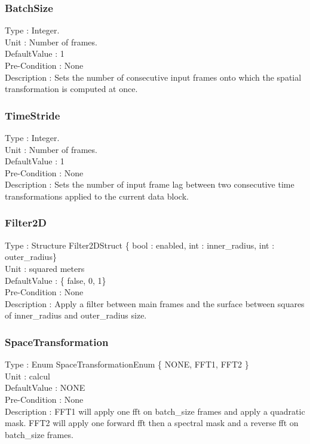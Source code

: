 \subsubsection{BatchSize}
\noindent
Type : Integer.\\
Unit : Number of frames.\\
DefaultValue : 1\\
Pre-Condition : None\\
Description : Sets the number of consecutive input frames onto which the spatial transformation is computed at once.\\

\subsubsection{TimeStride}
\noindent
Type : Integer.\\
Unit : Number of frames.\\
DefaultValue : 1\\
Pre-Condition : None\\
Description : Sets the number of input frame lag between two consecutive time transformations applied to the current data block.\\

\subsubsection{Filter2D}
\noindent
Type : Structure Filter2DStruct \{ bool : enabled, int : inner\_radius, int : outer\_radius\}\\
Unit : squared meters\\
DefaultValue : \{ false, 0, 1\}\\
Pre-Condition : None\\
Description : Apply a filter between main frames and the surface between squares of inner\_radius and outer\_radius size.\\

\subsubsection{SpaceTransformation}
\noindent
Type : Enum SpaceTransformationEnum \{ NONE, FFT1, FFT2 \}\\
Unit : calcul\\
DefaultValue : NONE\\
Pre-Condition : None\\
Description : FFT1 will apply one fft on batch\_size frames and apply a quadratic mask. FFT2 will apply one forward fft then a spectral mask and a reverse fft on batch\_size frames.\\

